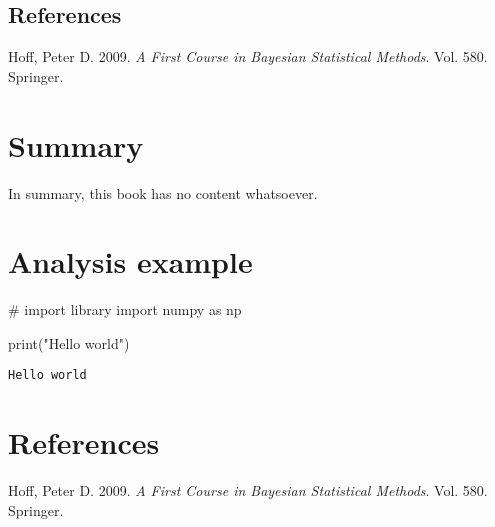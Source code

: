 \documentclass[
  letterpaper,
  DIV=11,
  numbers=noendperiod]{scrreprt}
\newenvironment{Shaded}{\begin{snugshade}}{\end{snugshade}}
\newcommand{\BuiltInTok}[1]{\textcolor[rgb]{0.00,0.23,0.31}{#1}}
\newcommand{\CommentTok}[1]{\textcolor[rgb]{0.37,0.37,0.37}{#1}}
\newcommand{\ImportTok}[1]{\textcolor[rgb]{0.00,0.46,0.62}{#1}}
\newcommand{\NormalTok}[1]{\textcolor[rgb]{0.00,0.23,0.31}{#1}}
\newcommand{\StringTok}[1]{\textcolor[rgb]{0.13,0.47,0.30}{#1}}
\newlength{\cslhangindent}
\newlength{\cslentryspacingunit} %
\newenvironment{CSLReferences}[2] %
 {%
  \setlength{\parindent}{0pt}
  \ifodd #1
  \let\oldpar\par
  \def\par{\hangindent=\cslhangindent\oldpar}
  \fi
  \setlength{\parskip}{#2\cslentryspacingunit}
 }%
 {}
\begin{document}
\hypertarget{references}{%
\section*{References}\label{references}}

\hypertarget{refs}{}
\begin{CSLReferences}{1}{0}
\leavevmode{}%
Hoff, Peter D. 2009. \emph{A First Course in Bayesian Statistical
Methods}. Vol. 580. Springer.

\end{CSLReferences}


\hypertarget{summary}{%
\chapter{Summary}\label{summary}}

In summary, this book has no content whatsoever.


\hypertarget{analysis-example}{%
\chapter{Analysis example}\label{analysis-example}}

\begin{Shaded}
\begin{Highlighting}[]
\CommentTok{\# import library}
\ImportTok{import}\NormalTok{ numpy }\ImportTok{as}\NormalTok{ np}
\end{Highlighting}
\end{Shaded}

\begin{Shaded}
\begin{Highlighting}[]
\BuiltInTok{print}\NormalTok{(}\StringTok{"Hello world"}\NormalTok{)}
\end{Highlighting}
\end{Shaded}

\begin{verbatim}
Hello world
\end{verbatim}


\hypertarget{references-1}{%
\chapter*{References}\label{references-1}}

\hypertarget{refs}{}
\begin{CSLReferences}{1}{0}
\leavevmode{}%
Hoff, Peter D. 2009. \emph{A First Course in Bayesian Statistical
Methods}. Vol. 580. Springer.

\end{CSLReferences}
\end{document}
